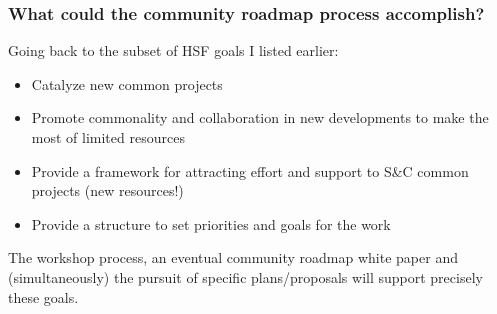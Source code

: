 \begin{frame}
 \frametitle{What could the community roadmap process accomplish?}
Going back to the subset of HSF goals I listed earlier:

\begin{itemize}
\item Catalyze new common projects
\item Promote commonality and collaboration in new developments to make the most of limited resources
\item Provide a framework for attracting effort and support to S\&C common projects (new resources!)
\item Provide a structure to set priorities and goals for the work
\end{itemize}

The workshop process, an eventual community roadmap white paper and (simultaneously) the pursuit of specific plans/proposals will support precisely these goals.

\end{frame}


